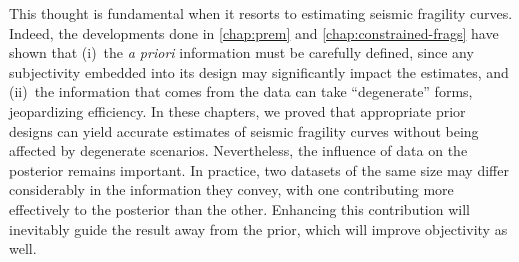 This thought is fundamental %
when it resorts to estimating seismic fragility curves.
Indeed, the developments done in \cref{chap:prem} and \cref{chap:constrained-frags}
have shown that (i)~the \emph{a priori} information  must be carefully defined, since any  subjectivity embedded into its design may significantly impact the estimates, and (ii)~the information that comes from the data can take ``degenerate'' forms, jeopardizing efficiency.
In these chapters, we proved that appropriate prior designs can yield accurate estimates of seismic fragility curves  
without being affected by degenerate scenarios.
Nevertheless, the influence of data on the posterior remains important. %
In practice, %
two datasets of the same size may differ considerably in the information they convey, with one contributing more effectively to the posterior than the other. Enhancing this contribution will inevitably guide the result away from the prior, which will improve objectivity as well.







